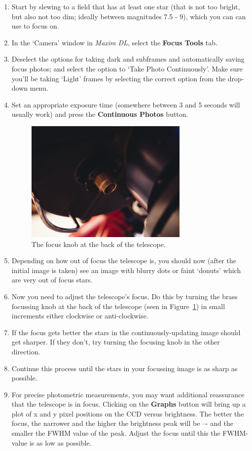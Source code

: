 \documentclass[12pt,twoside,a4paper]{report}
\begin{document}
\begin{enumerate}
 \item Start by slewing to a field that has at least one star (that is not too bright, but also not too dim; ideally between magnitudes 7.5 - 9), which you can can use to focus on.
 \item In the `Camera' window in \emph{Maxim DL}, select the \textbf{Focus Tools} tab. 
 \item Deselect the options for taking dark and subframes and automatically saving focus photos; and select the option to `Take Photo Continuously'. Make sure you'll be taking `Light' frames by selecting the correct option from the drop-down menu.
 \item Set an appropriate exposure time (somewhere between 3 and 5 seconds will usually work) and press the \textbf{Continuous Photos} button.

 \begin{figure}[ht]
  \centering
    \includegraphics[width=0.75\textwidth]{documentation_images/focus_knob.jpg}
    \caption{\label{fig:focus_knob}The focus knob at the back of the telescope.}
 \end{figure}

 \item Depending on how out of focus the telescope is, you should now (after the initial image is taken) see an image with blurry dots or faint `donuts' which are very out of focus stars.
 \item Now you need to adjust the telescope's focus. Do this by turning the brass focussing knob at the back of the telescope (seen in Figure~\ref{fig:focus_knob}) in small increments either clockwise or anti-clockwise.
 \item If the focus gets better the stars in the continuously-updating image should get sharper. If they don't, try turning the focusing knob in the other direction. 
 \item Continue this process until the stars in your focussing image is as sharp as possible.
 \item For precise photometric measurements, you may want additional reassurance that the telescope is in focus. Clicking on the \textbf{Graphs} button will bring up a plot of x and y pixel positions on the CCD versus brightness. The better the focus, the narrower and the higher the brightness peak will be –- and the smaller the FWHM value of the peak. Adjust the focus until this the FWHM-value is as low as possible.
\end{enumerate}
\end{document}
